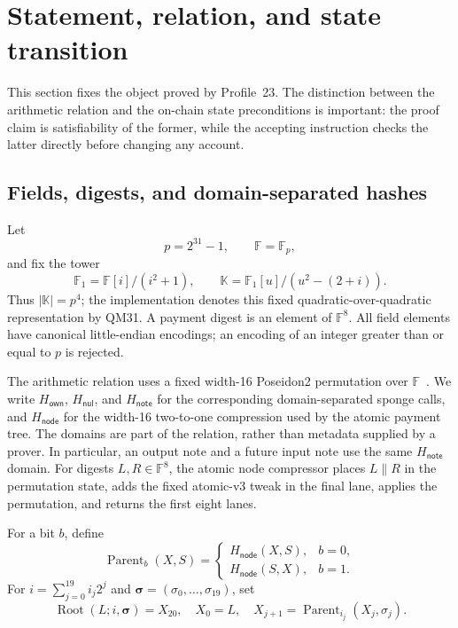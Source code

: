 \section{Statement, relation, and state transition}
\label{sec:relation}

This section fixes the object proved by Profile~23.  The distinction between
the arithmetic relation and the on-chain state preconditions is important:
the proof claim is satisfiability of the former, while the
accepting instruction checks the latter directly before changing any account.

\subsection{Fields, digests, and domain-separated hashes}

Let
\[
  p=2^{31}-1,\qquad \mathbb F=\mathbb F_p,
\]
and fix the tower
\[
  \mathbb F_1=\mathbb F[i]/(i^2+1),\qquad
  \mathbb K=\mathbb F_1[u]/(u^2-(2+i)).
\]
Thus \(|\mathbb K|=p^4\); the implementation denotes this fixed
quadratic-over-quadratic representation by \textsf{QM31}.  A payment digest is an element of
\(\mathbb F^8\).  All field elements have canonical little-endian encodings;
an encoding of an integer greater than or equal to \(p\) is rejected.

The arithmetic relation uses a fixed width-16 Poseidon2 permutation over
\(\mathbb F\)~\cite{GrassiKhovratovichSchofnegger2023}.  We write
\(H_{\mathsf{own}}\), \(H_{\mathsf{nul}}\), and \(H_{\mathsf{note}}\) for
the corresponding domain-separated sponge calls, and
\(H_{\mathsf{node}}\) for the width-16 two-to-one compression used by the
atomic payment tree.  The domains are part of the relation, rather than
metadata supplied by a prover.  In particular, an output note and a future
input note use the same \(H_{\mathsf{note}}\) domain.  For digests
\(L,R\in\mathbb F^8\), the atomic node compressor places \(L\|R\) in the
permutation state, adds the fixed atomic-v3 tweak in the final lane, applies
the permutation, and returns the first eight lanes.

For a bit \(b\), define
\[
  \operatorname{Parent}_b(X,S)=
  \begin{cases}
     H_{\mathsf{node}}(X,S),&b=0,\\
     H_{\mathsf{node}}(S,X),&b=1.
  \end{cases}
\]
For \(i=\sum_{j=0}^{19}i_j2^j\) and
\(\boldsymbol\sigma=(\sigma_0,\ldots,\sigma_{19})\), set
\[
  \operatorname{Root}(L;i,\boldsymbol\sigma)
   =X_{20},\quad X_0=L,\quad
   X_{j+1}=\operatorname{Parent}_{i_j}(X_j,\sigma_j).
\]

